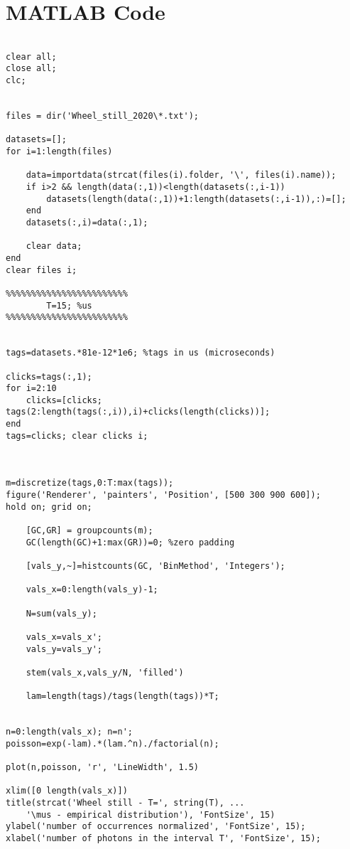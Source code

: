 \newpage \section{MATLAB Code}

\begin{lstlisting}[basicstyle=\scriptsize,]
%% STILL

clear all;
close all;
clc;


files = dir('Wheel_still_2020\*.txt');

datasets=[];
for i=1:length(files)
    
    data=importdata(strcat(files(i).folder, '\', files(i).name));
    if i>2 && length(data(:,1))<length(datasets(:,i-1))
        datasets(length(data(:,1))+1:length(datasets(:,i-1)),:)=[];
    end    
    datasets(:,i)=data(:,1);

    clear data;
end
clear files i;

%%%%%%%%%%%%%%%%%%%%%%%%
        T=15; %us
%%%%%%%%%%%%%%%%%%%%%%%%


tags=datasets.*81e-12*1e6; %tags in us (microseconds)

clicks=tags(:,1);
for i=2:10
    clicks=[clicks; tags(2:length(tags(:,i)),i)+clicks(length(clicks))];
end
tags=clicks; clear clicks i;



m=discretize(tags,0:T:max(tags));
figure('Renderer', 'painters', 'Position', [500 300 900 600]); 
hold on; grid on;

    [GC,GR] = groupcounts(m);
    GC(length(GC)+1:max(GR))=0; %zero padding

    [vals_y,~]=histcounts(GC, 'BinMethod', 'Integers');
    
    vals_x=0:length(vals_y)-1; 
    
    N=sum(vals_y);
    
    vals_x=vals_x';
    vals_y=vals_y';
    
    stem(vals_x,vals_y/N, 'filled')
    
    lam=length(tags)/tags(length(tags))*T;


n=0:length(vals_x); n=n'; 
poisson=exp(-lam).*(lam.^n)./factorial(n);

plot(n,poisson, 'r', 'LineWidth', 1.5)

xlim([0 length(vals_x)])
title(strcat('Wheel still - T=', string(T), ...
    '\mus - empirical distribution'), 'FontSize', 15)
ylabel('number of occurrences normalized', 'FontSize', 15);
xlabel('number of photons in the interval T', 'FontSize', 15);


\end{lstlisting}
